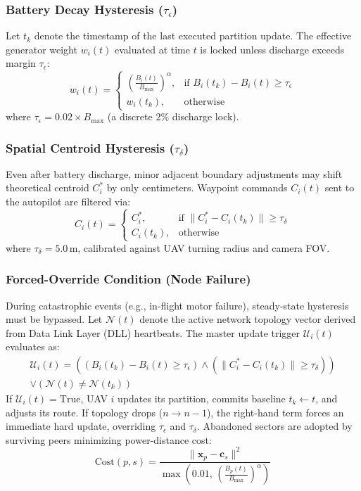 \documentclass[conference]{IEEEtran}
\begin{document}
\subsubsection{Battery Decay Hysteresis ($\tau_\epsilon$)}
Let $t_k$ denote the timestamp of the last executed partition update. The effective generator weight $w_i(t)$ evaluated at time $t$ is locked unless discharge exceeds margin $\tau_\epsilon$:
\begin{equation}
    w_i(t) = \begin{cases}
        \left( \frac{B_i(t)}{B_{\text{max}}} \right)^\alpha, & \text{if } B_i(t_k) - B_i(t) \ge \tau_\epsilon \\
        w_i(t_k), & \text{otherwise}
    \end{cases}
\end{equation}
where $\tau_\epsilon = 0.02 \times B_{\text{max}}$ (a discrete $2\%$ discharge lock).

\subsubsection{Spatial Centroid Hysteresis ($\tau_\delta$)}
Even after battery discharge, minor adjacent boundary adjustments may shift theoretical centroid $C_i^*$ by only centimeters. Waypoint commands $C_i(t)$ sent to the autopilot are filtered via:
\begin{equation}
    C_i(t) = \begin{cases}
        C_i^*, & \text{if } \|C_i^* - C_i(t_k)\| \ge \tau_\delta \\
        C_i(t_k), & \text{otherwise}
    \end{cases}
\end{equation}
where $\tau_\delta = 5.0\,\text{m}$, calibrated against UAV turning radius and camera FOV.

\subsubsection{Forced-Override Condition (Node Failure)}
During catastrophic events (e.g., in-flight motor failure), steady-state hysteresis must be bypassed. Let $\mathcal{N}(t)$ denote the active network topology vector derived from Data Link Layer (DLL) heartbeats. The master update trigger $\mathcal{U}_i(t)$ evaluates as:
\begin{multline}
    \mathcal{U}_i(t) = \left( (B_i(t_k) - B_i(t) \ge \tau_\epsilon) \land (\|C_i^* - C_i(t_k)\| \ge \tau_\delta) \right) \\
    \lor (\mathcal{N}(t) \ne \mathcal{N}(t_k))
\end{multline}
If $\mathcal{U}_i(t) = \text{True}$, UAV $i$ updates its partition, commits baseline $t_k \leftarrow t$, and adjusts its route. If topology drops ($n \to n-1$), the right-hand term forces an immediate hard update, overriding $\tau_\epsilon$ and $\tau_\delta$. Abandoned sectors are adopted by surviving peers minimizing power-distance cost:
\begin{equation}
    \text{Cost}(p, s) = \frac{\|\mathbf{x}_p - \mathbf{c}_s\|^2}{\max\left(0.01, \, \left(\frac{B_p(t)}{B_{\text{max}}}\right)^\alpha\right)}
\end{equation}
\end{document}
